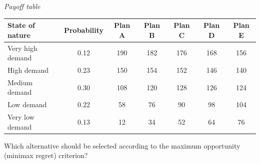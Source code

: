 \begin{ExamProblems}
		\begin{center}
			\textit{Payoff table} \par
			\begin{tabular}{l c c c c c c}
				\toprule
				State of nature & Probability & Plan A & Plan B & Plan C & Plan D & Plan E \\
				\midrule
				Very high demand & 0.12 & 190 & 182 & 176 & 168 & 156 \\
				High demand & 0.23 & 150 & 154 & 152 & 146 & 140 \\
				Medium demand & 0.30 & 108 & 120 & 128 & 126 & 124 \\
				Low demand & 0.22 & 58 & 76 & 90 & 98 & 104 \\
				Very low demand & 0.13 & 12 & 34 & 52 & 64 & 76 \\
				\bottomrule
			\end{tabular}
		\end{center}

		Which alternative should be selected according to the maximum opportunity (minimax regret) criterion?


\end{ExamProblems}
